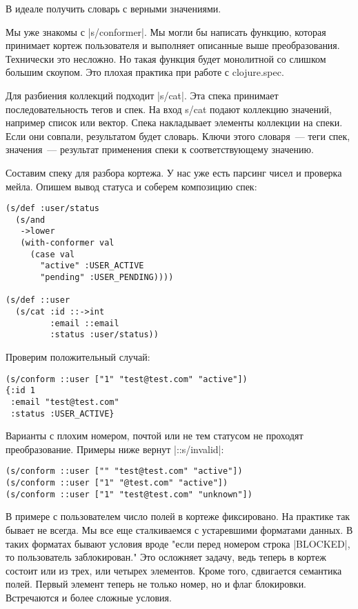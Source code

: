 В идеале получить словарь с верными значениями.

Мы уже знакомы с \spverb|s/conformer|. Мы могли бы написать функцию, которая принимает
кортеж пользователя и выполняет описанные выше преобразования. Технически это
несложно. Но такая функция будет монолитной со слишком большим скоупом. Это
плохая практика при работе с clojure.spec.

Для разбиения коллекций подходит \spverb|s/cat|. Эта спека принимает последовательность
тегов и спек. На вход s/cat подают коллекцию значений, например список или
вектор. Спека накладывает элементы коллекции на спеки. Если они совпали,
результатом будет словарь. Ключи этого словаря~--- теги спек, значения~--- результат
применения спеки к соответствующему значению.

Составим спеку для разбора кортежа. У нас уже есть парсинг чисел и проверка
мейла. Опишем вывод статуса и соберем композицию спек:

\begin{verbatim}
(s/def :user/status
  (s/and
   ->lower
   (with-conformer val
     (case val
       "active" :USER_ACTIVE
       "pending" :USER_PENDING))))

(s/def ::user
  (s/cat :id ::->int
         :email ::email
         :status :user/status))
\end{verbatim}

Проверим положительный случай:

\begin{verbatim}
(s/conform ::user ["1" "test@test.com" "active"])
{:id 1
 :email "test@test.com"
 :status :USER_ACTIVE}
\end{verbatim}

Варианты с плохим номером, почтой или не тем статусом не проходят
преобразование. Примеры ниже вернут \spverb|::s/invalid|:

\begin{verbatim}
(s/conform ::user ["" "test@test.com" "active"])
(s/conform ::user ["1" "@test.com" "active"])
(s/conform ::user ["1" "test@test.com" "unknown"])
\end{verbatim}

В примере с пользователем число полей в кортеже фиксировано. На практике так
бывает не всегда. Мы все еще сталкиваемся с устаревшими форматами данных. В
таких форматах бывают условия вроде "если перед номером строка \spverb|BLOCKED|, то
пользователь заблокирован." Это осложняет задачу, ведь теперь в кортеж состоит
или из трех, или четырех элементов. Кроме того, сдвигается семантика
полей. Первый элемент теперь не только номер, но и флаг блокировки. Встречаются
и более сложные условия.

